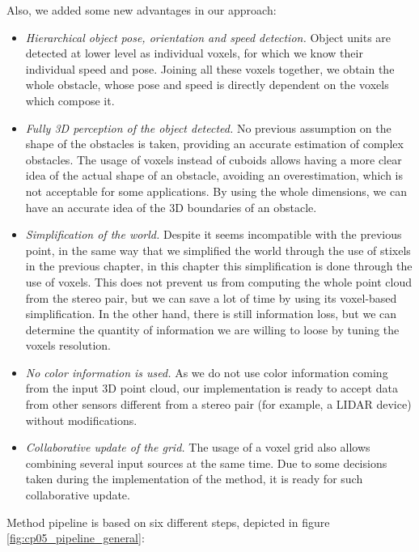Also, we added some new advantages in our approach:
\begin{itemize}
 \item \emph{Hierarchical object pose, orientation and speed detection.} Object units are detected at lower level as individual voxels, for which we know their individual speed and pose. Joining all these voxels together, we obtain the whole obstacle, whose pose and speed is directly dependent on the voxels which compose it. 
 \item \emph{Fully 3D perception of the object detected.} No previous assumption on the shape of the obstacles is taken, providing an accurate estimation of complex obstacles. The usage of voxels instead of cuboids allows having a more clear idea of the actual shape of an obstacle, avoiding an overestimation, which is not acceptable for some applications. By using the whole dimensions, we can have an accurate idea of the 3D boundaries of an obstacle.
 \item \emph{Simplification of the world.} Despite it seems incompatible with the previous point, in the same way that we simplified the world through the use of stixels in the previous chapter, in this chapter this simplification is done through the use of voxels. This does not prevent us from computing the whole point cloud from the stereo pair, but we can save a lot of time by using its voxel-based simplification. In the other hand, there is still information loss, but we can determine the quantity of information we are willing to loose by tuning the voxels resolution.
 \item \emph{No color information is used.} As we do not use color information coming from the input 3D point cloud, our implementation is ready to accept data from other sensors different from a stereo pair (for example, a \ac{LIDAR} device) without modifications.
 \item \emph{Collaborative update of the grid.} The usage of a voxel grid also allows combining several input sources at the same time. Due to some decisions taken during the implementation of the method, it is ready for such collaborative update.
\end{itemize}

Method pipeline is based on six different steps, depicted in figure \ref{fig:cp05_pipeline_general}:


